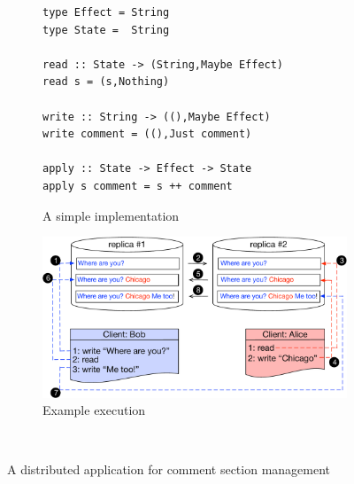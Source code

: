 \begin{figure}[t]
        \centering
	\begin{subfigure}[b]{0.489\textwidth}
	\begin{lstlisting}
type Effect = String 
type State =  String 

read :: State -> (String,Maybe Effect)
read s = (s,Nothing)

write :: String -> ((),Maybe Effect)
write comment = ((),Just comment)

apply :: State -> Effect -> State 
apply s comment = s ++ comment
	\end{lstlisting}
	\caption{A simple implementation}
	\label{subfig:comment_code}
	\end{subfigure}
	\hfill
	\begin{subfigure}[b]{0.475\textwidth}
	\includegraphics[scale=0.282]{Figures/comment_application.pdf}
	\caption{Example execution}
	\label{subfig:example_exec}
	\end{subfigure} 
\\ \hrulefill
\caption{A distributed application for comment section
management}
\label{fig:comment_app}
\end{figure}


